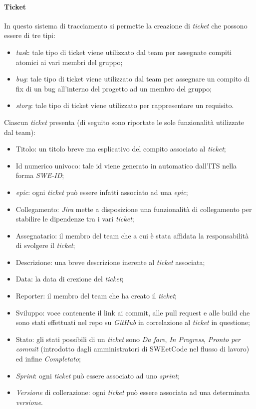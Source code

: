 \documentclass[10pt, a4paper]{article}
\begin{document}
\paragraph{Ticket}
In questo sistema di tracciamento si permette la creazione di \textit{ticket} che possono essere di tre tipi:
\begin{itemize}
    \item \textit{task}: tale tipo di ticket viene utilizzato dal team per assegnate compiti atomici ai vari membri del gruppo;
    \item \textit{bug}: tale tipo di ticket viene utilizzato dal team per assegnare un compito di fix di un bug all'interno del progetto ad un membro del gruppo; 
    \item \textit{story}: tale tipo di ticket viene utilizzato per rappresentare un requisito.
\end{itemize}
Ciascun \textit{ticket} presenta (di seguito sono riportate le sole funzionalità utilizzate dal team):
\begin{itemize}
    \item Titolo: un titolo breve ma esplicativo del compito associato al \textit{ticket};
    \item Id numerico univoco: tale id viene generato in automatico dall'ITS nella forma \textit{SWE-ID};
    \item \textit{epic}: ogni \textit{ticket} può essere infatti associato ad una \textit{epic};
    \item Collegamento: \textit{Jira} mette a disposizione una funzionalità di collegamento per stabilire le dipendenze tra i vari \textit{ticket};
    \item Assegnatario: il membro del team che a cui è stata affidata la responsabilità di svolgere il \textit{ticket};
    \item Descrizione: una breve descrizione inerente al \textit{ticket} associata;
    \item Data: la data di crezione del \textit{ticket};
    \item Reporter: il membro del team che ha creato il \textit{ticket};
    \item Sviluppo: voce contenente il link ai commit, alle pull request e alle build che sono stati effettuati nel repo su \textit{GitHub} in correlazione al \textit{ticket} in questione;
    \item Stato: gli stati possibili di un \textit{ticket} sono \textit{Da fare}, \textit{In Progress}, \textit{Pronto per commit} (introdotto dagli amministratori di SWEetCode nel flusso di lavoro) ed infine \textit{Completato};
    \item \textit{Sprint}: ogni \textit{ticket} può essere associato ad uno \textit{sprint};
    \item \textit{Versione} di collerazione: ogni \textit{ticket} può essere associata ad una determinata \textit{versione}.
\end{itemize}
\end{document}
